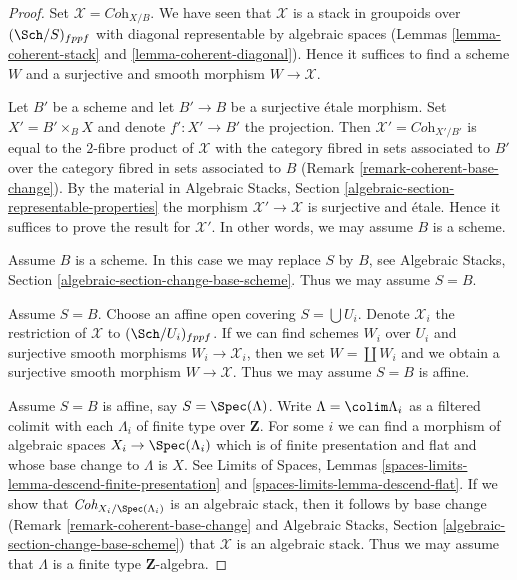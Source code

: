 \begin{proof}
Set $\mathcal{X} = \textit{Coh}_{X/B}$. We have seen that $\mathcal{X}$
is a stack in groupoids over $(\Sch/S)_{fppf}$ with diagonal representable
by algebraic spaces
(Lemmas \ref{lemma-coherent-stack} and \ref{lemma-coherent-diagonal}).
Hence it suffices to find a scheme $W$ and a surjective and smooth
morphism $W \to \mathcal{X}$.

\medskip\noindent
Let $B'$ be a scheme and let $B' \to B$ be a surjective \'etale morphism.
Set $X' = B' \times_B X$ and denote $f' : X' \to B'$ the projection.
Then $\mathcal{X}' = \textit{Coh}_{X'/B'}$ is equal to the $2$-fibre
product of $\mathcal{X}$ with the category fibred in sets
associated to $B'$ over the category fibred in sets associated to $B$
(Remark \ref{remark-coherent-base-change}). By the material in
Algebraic Stacks, Section \ref{algebraic-section-representable-properties}
the morphism $\mathcal{X}' \to \mathcal{X}$ is surjective and \'etale.
Hence it suffices to prove the result for $\mathcal{X}'$.
In other words, we may assume $B$ is a scheme.

\medskip\noindent
Assume $B$ is a scheme. In this case we may replace $S$ by $B$, see
Algebraic Stacks, Section \ref{algebraic-section-change-base-scheme}.
Thus we may assume $S = B$.

\medskip\noindent
Assume $S = B$. Choose an affine open covering $S = \bigcup U_i$.
Denote $\mathcal{X}_i$ the restriction of $\mathcal{X}$ to
$(\Sch/U_i)_{fppf}$. If we can find schemes $W_i$ over $U_i$ and
surjective smooth morphisms $W_i \to \mathcal{X}_i$, then we
set $W = \coprod W_i$ and we obtain a surjective smooth morphism
$W \to \mathcal{X}$. Thus we may assume $S = B$ is affine.

\medskip\noindent
Assume $S = B$ is affine, say $S = \Spec(\Lambda)$.
Write $\Lambda = \colim \Lambda_i$ as a filtered colimit with each $\Lambda_i$
of finite type over $\mathbf{Z}$. For some $i$ we can find
a morphism of algebraic spaces $X_i \to \Spec(\Lambda_i)$
which is of finite presentation and flat and whose base change
to $\Lambda$ is $X$. See
Limits of Spaces, Lemmas
\ref{spaces-limits-lemma-descend-finite-presentation} and
\ref{spaces-limits-lemma-descend-flat}.
If we show that $\textit{Coh}_{X_i/\Spec(\Lambda_i)}$ is an
algebraic stack, then it follows by base change
(Remark \ref{remark-coherent-base-change} and
Algebraic Stacks, Section \ref{algebraic-section-change-base-scheme})
that $\mathcal{X}$ is an algebraic stack.
Thus we may assume that $\Lambda$ is a finite type $\mathbf{Z}$-algebra.


\end{proof}
